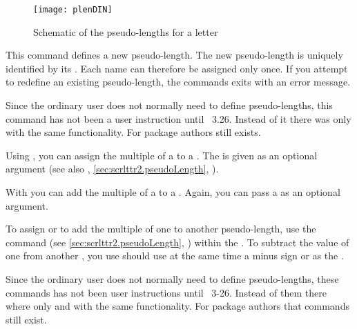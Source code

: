 \begin{figure}
  \centering
  \texttt{[image: plenDIN]}
  \caption{Schematic of the pseudo-lengths for a letter}
  \label{fig:scrlttr2-experts.pseudoLength}
\end{figure}


\begin{Declaration}
\end{Declaration}
This command
defines a new pseudo-length. The new pseudo-length is uniquely identified by
its . Each name can therefore be assigned only once. If you
attempt to redefine an existing pseudo-length, the commands exits with an
error message.

%
Since the ordinary user does not normally need to define pseudo-lengths, this
command has not been a user instruction until \KOMAScript~3.26. Instead of it
there was only  with the same functionality. For package
authors  still exists.%
\EndIndexGroup


\begin{Declaration}
\end{Declaration}
Using , you can assign the multiple of a
 to a . The  is given as an
optional argument (see also ,
\autoref{sec:scrlttr2.pseudoLength},
).

With  you can add the multiple of a  to a
. Again, you can pass a  as an optional
argument.

To assign or to add the multiple of one  to another
pseudo-length, use the  command (see
\autoref{sec:scrlttr2.pseudoLength}, )
within the . To subtract the value of one 
from another , you use should use at the same time a
minus sign or  as the .

%
%
Since the ordinary user does not normally need to define pseudo-lengths, these
commands has not been user instructions until \KOMAScript~3-26. Instead of
them there where only  and  with the
same functionality. For package authors that commands still exist.%
\EndIndexGroup

